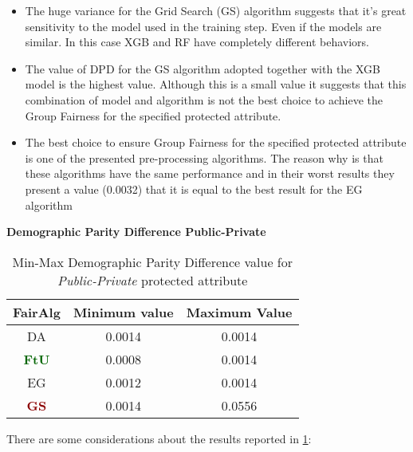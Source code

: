 \begin{itemize}
    \item The huge variance for the Grid Search (GS) algorithm suggests that it's great sensitivity to the model used in the training step. Even if the models are similar. In this case XGB and RF have completely different behaviors.

    \item The value of DPD for the GS algorithm adopted together with the XGB model is the highest value. Although this is a small value it suggests that this combination of model and algorithm is not the best choice to achieve the Group Fairness for the specified protected attribute.

    \item The best choice to ensure Group Fairness for the specified protected attribute is one of the presented pre-processing algorithms. The reason why is that these algorithms have the same performance and in their worst results they present a value (0.0032) that it is equal to the best result for the EG algorithm
\end{itemize}

\textbf{Demographic Parity Difference Public-Private}
\begin{table}
    \centering
    \begin{tabular}{|c|c|c|}
        \hline
        \textbf{FairAlg} & \textbf{Minimum value} & \textbf{Maximum Value} \\
        \hline
        DA & 0.0014 & 0.0014 \\
        \hline
        \textcolor{darkgreen}{\textbf{FtU}} & 0.0008 & 0.0014 \\
        \hline
        EG & 0.0012 & 0.0014 \\
        \hline
        \textcolor{darkred}{\textbf{GS}} & 0.0014 & 0.0556 \\
        \hline
    \end{tabular}
    \caption{Min-Max Demographic Parity Difference value for \emph{Public-Private} protected attribute}
    \label{tab:pp_dpd}
\end{table}

There are some considerations about the results reported in \cref{tab:pp_dpd}:

